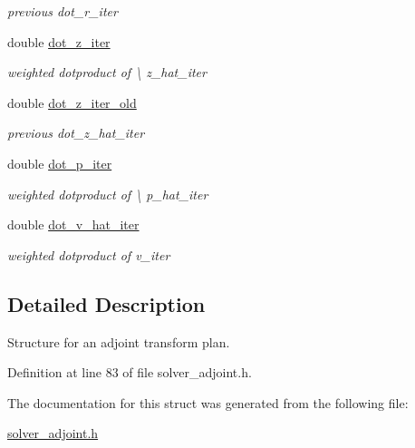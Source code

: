 \begin{DoxyCompactItemize}
\begin{DoxyCompactList}\small\item\em previous dot\-\_\-r\-\_\-iter \end{DoxyCompactList}\item 
\hypertarget{structinnfft__adjoint__plan_aae72bba8cc1a211c1b3931c969f95a85}{double \hyperlink{structinnfft__adjoint__plan_aae72bba8cc1a211c1b3931c969f95a85}{dot\-\_\-z\-\_\-iter}}\label{structinnfft__adjoint__plan_aae72bba8cc1a211c1b3931c969f95a85}

\begin{DoxyCompactList}\small\item\em weighted dotproduct of \textbackslash{} z\-\_\-hat\-\_\-iter \end{DoxyCompactList}\item 
\hypertarget{structinnfft__adjoint__plan_a669c48fd77d0d04bf0adc4ebedbd699f}{double \hyperlink{structinnfft__adjoint__plan_a669c48fd77d0d04bf0adc4ebedbd699f}{dot\-\_\-z\-\_\-iter\-\_\-old}}\label{structinnfft__adjoint__plan_a669c48fd77d0d04bf0adc4ebedbd699f}

\begin{DoxyCompactList}\small\item\em previous dot\-\_\-z\-\_\-hat\-\_\-iter \end{DoxyCompactList}\item 
\hypertarget{structinnfft__adjoint__plan_a3d20a53eb3c0158cc401d7b0d640da07}{double \hyperlink{structinnfft__adjoint__plan_a3d20a53eb3c0158cc401d7b0d640da07}{dot\-\_\-p\-\_\-iter}}\label{structinnfft__adjoint__plan_a3d20a53eb3c0158cc401d7b0d640da07}

\begin{DoxyCompactList}\small\item\em weighted dotproduct of \textbackslash{} p\-\_\-hat\-\_\-iter \end{DoxyCompactList}\item 
\hypertarget{structinnfft__adjoint__plan_a5d9a12eacf094e7f9e771add0a3874d5}{double \hyperlink{structinnfft__adjoint__plan_a5d9a12eacf094e7f9e771add0a3874d5}{dot\-\_\-v\-\_\-hat\-\_\-iter}}\label{structinnfft__adjoint__plan_a5d9a12eacf094e7f9e771add0a3874d5}

\begin{DoxyCompactList}\small\item\em weighted dotproduct of v\-\_\-iter \end{DoxyCompactList}\end{DoxyCompactItemize}


\subsection{Detailed Description}
Structure for an adjoint transform plan. 

Definition at line 83 of file solver\-\_\-adjoint.\-h.



The documentation for this struct was generated from the following file\-:\begin{DoxyCompactItemize}
\item 
\hyperlink{solver__adjoint_8h}{solver\-\_\-adjoint.\-h}\end{DoxyCompactItemize}
